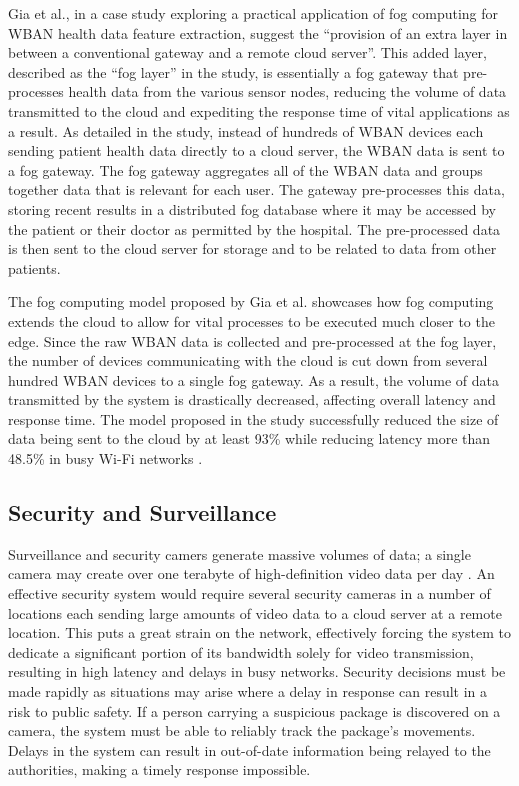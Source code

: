 \documentclass{article}
\begin{document}
Gia et al., in a case study exploring a practical application of fog computing for WBAN health data feature extraction,  suggest the ``provision of an extra layer in between a conventional gateway and a remote cloud server''\cite{gia2015fog}. This added layer, described as the ``fog layer'' in the study, is essentially a fog gateway that pre-processes health data from the various sensor nodes, reducing the volume of data transmitted to the cloud and expediting the response time of vital applications as a result. As detailed in the study, instead of hundreds of WBAN devices each sending patient health data directly to a cloud server, the WBAN data is sent to a fog gateway. The fog gateway aggregates all of the WBAN data and groups together data that is relevant for each user. The gateway pre-processes this data, storing recent results in a distributed fog database where it may be accessed by the patient or their doctor as permitted by the hospital. The pre-processed data is then sent to the cloud server for storage and to be related to data from other patients.

The fog computing model proposed by Gia et al. showcases how fog computing extends the cloud to allow for vital processes to be executed much closer to the edge. Since the raw WBAN data is collected and pre-processed at the fog layer, the number of devices communicating with the cloud is cut down from several hundred WBAN devices to a single fog gateway. As a result, the volume of data transmitted by the system is drastically decreased, affecting overall latency and response time. The model proposed in the study successfully reduced the size of data being sent to the cloud by at least 93\% while reducing latency more than 48.5\% in busy Wi-Fi networks \cite{gia2015fog}. 

\subsection{Security and Surveillance}
Surveillance and security camers generate massive volumes of data; a single camera may create over one terabyte of high-definition video data per day \cite{openfogconsortium2017visualsecurity}. An effective security system would require several security cameras in a number of locations each sending large amounts of video data to a cloud server at a remote location. This puts a great strain on the network, effectively forcing the system to dedicate a significant portion of its bandwidth solely for video transmission, resulting in high latency and delays in busy networks. Security decisions must be made rapidly as situations may arise where a delay in response can result in a risk to public safety. If a person carrying a suspicious package is discovered on a camera, the system must be able to reliably track the package's movements. Delays in the system can result in out-of-date information being relayed to the authorities, making a timely response impossible.
\end{document}
